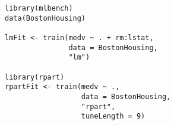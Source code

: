 \documentclass[caret-main.tex]{subfiles}
\begin{document}
\begin{framed}
\begin{verbatim}
library(mlbench)
data(BostonHousing)
 
lmFit <- train(medv ~ . + rm:lstat,
               data = BostonHousing, 
               "lm")
 
library(rpart)
rpartFit <- train(medv ~ .,
                  data = BostonHousing,
                  "rpart",
                  tuneLength = 9)
                  
                  
\end{verbatim}
\end{framed}
\end{document}
